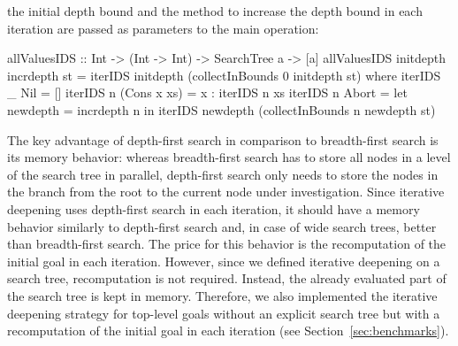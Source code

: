 \documentclass[english]{lni}
\begin{document}
the initial depth bound and the method to increase the depth bound
in each iteration are passed as parameters to the main operation:
%
\begin{curry}
allValuesIDS :: Int -> (Int -> Int) -> SearchTree a -> [a]
allValuesIDS initdepth incrdepth st =
  iterIDS initdepth (collectInBounds 0 initdepth st)
 where
  iterIDS _ Nil = []
  iterIDS n (Cons x xs) = x : iterIDS n xs
  iterIDS n Abort = let newdepth = incrdepth n
                     in iterIDS newdepth (collectInBounds n newdepth st)
\end{curry}
%
The key advantage of depth-first search
in comparison to breadth-first search is its memory behavior:
whereas breadth-first search has to store all nodes
in a level of the search tree in parallel, depth-first search
only needs to store the nodes in the branch from the root
to the current node under investigation.
Since iterative deepening uses depth-first search in each iteration,
it should have a memory behavior similarly to depth-first search
and, in case of wide search trees,
better than breadth-first search.
The price for this behavior is the recomputation of the initial
goal in each iteration. 
However, since we defined iterative deepening on a search tree,
recomputation is not required. Instead, the
already evaluated part of the search tree is kept in memory.
Therefore, we also implemented the iterative deepening strategy
for top-level goals without an explicit search tree
but with a recomputation of the initial goal in each iteration
(see Section~\ref{sec:benchmarks}).
\end{document}
